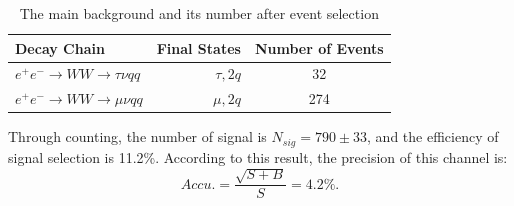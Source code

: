 \documentclass[11pt,a4paper]{cepcnote}
\begin{document}
\begin{table}[H]
	\begin{center}
		\begin{tabular}{lrc}
			\hline\hline
			Decay Chain	& Final States 	&	Number of Events	\\
			\hline
			$e^+e^-\to WW \to \tau\nu qq $ 	& $\tau, 2q$&	32\\
			$e^+e^-\to WW \to \mu\nu qq $ 	& $\mu, 2q$	&	274\\
			\hline\hline
		\end{tabular}
		\caption[]{The main background and its number after event selection}
		\label{tab:bkginvvuvqq}
	\end{center}
\end{table}
Through counting, the number of signal is $N_{sig} = 790\pm 33$, and the efficiency of signal selection is 11.2\%.
According to this result, the precision of this channel is:
\begin{equation*}
	Accu. =\frac{\sqrt{S+B}}{S} = 4.2\%.
\end{equation*}
\end{document}
